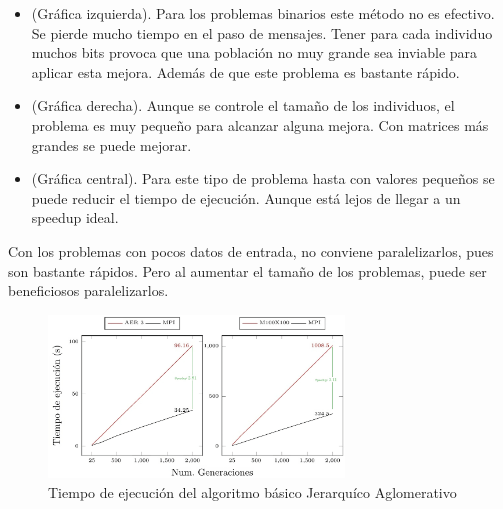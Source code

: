 		\begin{itemize}
			\item (Gráfica izquierda). Para los problemas binarios este método no es efectivo. Se pierde mucho tiempo en el paso de mensajes. Tener para cada individuo muchos bits provoca que una población no muy grande sea inviable para aplicar esta mejora. Además de que este problema es bastante rápido.
			\item (Gráfica derecha). Aunque se controle el tamaño de los individuos, el problema es muy pequeño para alcanzar alguna mejora. Con matrices más grandes se puede mejorar.
			\item (Gráfica central). Para este tipo de problema hasta con valores pequeños se puede reducir el tiempo de ejecución. Aunque está lejos de llegar a un speedup ideal.
		\end{itemize}

		Con los problemas con pocos datos de entrada, no conviene paralelizarlos, pues son bastante rápidos. Pero al aumentar el tamaño de los problemas, puede ser beneficiosos paralelizarlos.
		
		\newpage

		\begin{figure}[!h]
			\centering
			\includegraphics[width=0.7\textwidth]{images/chapter_4/pev_mpi1}
			\caption{Tiempo de ejecución del algoritmo básico Jerarquíco Aglomerativo}
			\label{fig:MPI1.2 - Dividir Poblacion + Speedup}
		\end{figure}

